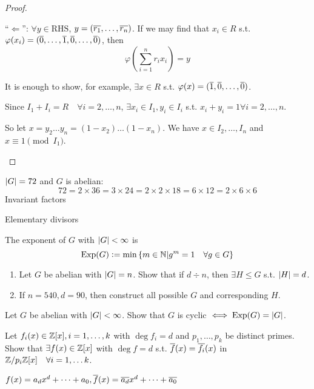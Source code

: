\begin{theorem}
\begin{proof}
\begin{enumerate}[(1)]
        ``$\Leftarrow$'': $\forall y \in \text{RHS}$,
        $y = (\overline{r_1}, \dots, \overline{r_n})$.
        If we may find that $x_i \in R$ s.t.
        $\varphi(x_i) = (\overline{0}, \dots, \overline{1}, \overline{0}, \dots, \overline{0})$,
        then
        \[
          \varphi\left(\sum_{i=1}^n r_ix_i \right) = y
        \]

        It is enough to show, for example, $\exists x \in R$ s.t.
        $\varphi(x) = (\overline{1}, \overline{0}, \dots, \overline{0})$.

        Since $I_1 + I_i = R \quad \forall i = 2, \dots, n$,
        $\exists x_i \in I_1, y_i \in I_i$ s.t. $x_i + y_i = 1
        \forall i = 2, \dots, n$.

        So let $x = y_2\dots y_n = (1-x_2)\dots(1-x_n)$.
        We have $x \in I_2, \dots, I_n$ and $x \equiv 1 \pmod {I_1}$.
    \end{enumerate}
  \end{proof}
\end{theorem}

\begin{example}
  $\lvert G\rvert = 72$ and $G$ is abelian:
  \[
    72 = 2 \times 36 = 3 \times 24 = 2 \times 2 \times 18
    = 6 \times 12 = 2 \times 6 \times 6
  \]
  Invariant factors

  Elementary divisors
\end{example}

\begin{definition}
  The exponent of $G$ with $\lvert G\rvert < \infty$ is
  \[
    \operatorname{Exp}(G) \vcentcolon= \min \left\{
      m \in \mathbb{N} \middle| g^m = 1 \quad \forall g \in G
    \right\}
  \]
\end{definition}

\begin{exercise} \mbox{}
  \begin{enumerate}
    \item Let $G$ be abelian with $\lvert G\rvert = n$. Show that if $d \div n$, then
      $\exists H \le G$ s.t. $\lvert H\rvert = d$.
    \item If $n=540, d=90$, then construct all possible $G$ and
      corresponding $H$.
  \end{enumerate}
\end{exercise}

\begin{exercise}
  Let $G$ be abelian with $\lvert G\rvert < \infty$. Show that $G$ is cyclic
  $\iff \operatorname{Exp}(G) = \lvert G\rvert$.
\end{exercise}

\begin{exercise}
  Let $f_i(x) \in \mathbb{Z}[x], i = 1, \dots, k$ with $\deg f_i = d$ and
  $p_1, \dots, p_k$ be distinct primes.
  Show that $\exists f(x) \in \mathbb{Z}[x]$ with $\deg f = d$ s.t.
  $\overline{f}(x) = \overline{f_i}(x)$ in 
  ${\mathbb{Z}}/{p_i\mathbb{Z}}[x] \quad \forall i = 1, \dots k$.

  $f(x) = a_d x^d + \dots + a_0,
  \overline{f}(x) = \overline{a_d} x^d + \dots + \overline{a_0}$
\end{exercise}

